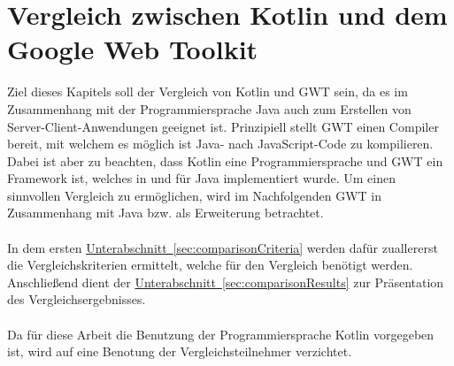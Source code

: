 
\chapter{Vergleich zwischen Kotlin und dem Google Web Toolkit}\label{sec:comparison}
Ziel dieses Kapitels soll der Vergleich von Kotlin und \gls{GWT} sein, da es im Zusammenhang mit der Programmiersprache Java auch zum Erstellen von Server-Client-Anwendungen geeignet ist.
Prinzipiell stellt \gls{GWT} einen Compiler bereit, mit welchem es möglich ist Java- nach JavaScript-Code zu kompilieren. Dabei ist aber zu beachten, dass Kotlin eine Programmiersprache und \gls{GWT} ein Framework ist, welches in und für Java implementiert wurde. Um einen sinnvollen Vergleich zu ermöglichen, wird im Nachfolgenden \gls{GWT} in Zusammenhang mit Java bzw. als Erweiterung betrachtet.\\
\\
In dem ersten \hyperref[sec:comparisonCriteria]{Unterabschnitt~\ref{sec:comparisonCriteria}} werden dafür zuallererst die Vergleichskriterien ermittelt, welche für den Vergleich benötigt werden. Anschließend dient der \hyperref[sec:comparisonResults]{Unterabschnitt~\ref{sec:comparisonResults}} zur Präsentation des Vergleichsergebnisses.\\
\\
Da für diese Arbeit die Benutzung der Programmiersprache Kotlin vorgegeben ist, wird auf eine Benotung der Vergleichsteilnehmer verzichtet.

